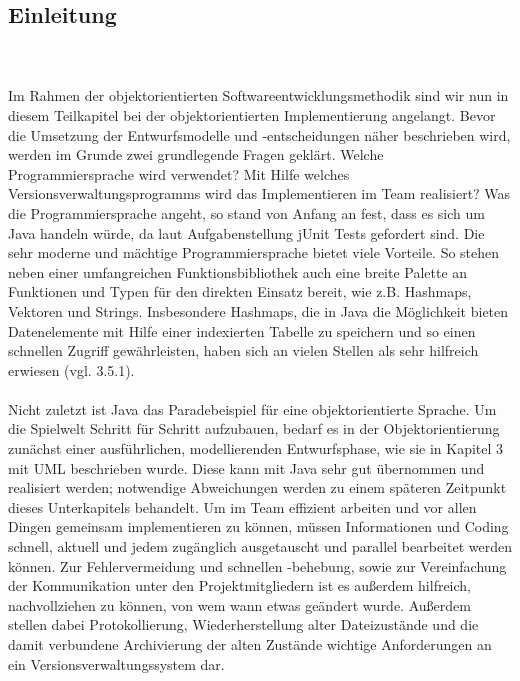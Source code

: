 \subsection{Einleitung}
\label{sub:fachkonzept-implementierung-einleitung}

\\
\\
Im Rahmen der objektorientierten Softwareentwicklungsmethodik sind wir nun in diesem Teilkapitel bei der objektorientierten Implementierung angelangt. Bevor die Umsetzung der Entwurfsmodelle und -entscheidungen näher beschrieben wird, werden im Grunde zwei grundlegende Fragen geklärt. Welche Programmiersprache wird verwendet? Mit Hilfe welches Versionsverwaltungsprogramms wird das Implementieren im Team realisiert?
Was die Programmiersprache angeht, so stand von Anfang an fest, dass es sich um Java handeln würde, da laut Aufgabenstellung jUnit Tests gefordert sind. Die sehr moderne und mächtige Programmiersprache bietet viele Vorteile. So stehen neben einer umfangreichen Funktionsbibliothek auch eine breite Palette an Funktionen und Typen für den direkten Einsatz bereit, wie z.B. Hashmaps, Vektoren und Strings. Insbesondere Hashmaps, die in Java die Möglichkeit bieten Datenelemente mit Hilfe einer indexierten Tabelle zu speichern und so einen schnellen Zugriff gewährleisten, haben sich an vielen Stellen als sehr hilfreich erwiesen (vgl. 3.5.1). 
\\
\\
Nicht zuletzt ist Java das Paradebeispiel für eine objektorientierte Sprache. Um die Spielwelt Schritt für Schritt aufzubauen, bedarf es in der Objektorientierung zunächst einer ausführlichen, modellierenden Entwurfsphase, wie sie in Kapitel 3 mit UML beschrieben wurde. Diese kann mit Java sehr gut übernommen und realisiert werden; notwendige Abweichungen werden zu einem späteren Zeitpunkt dieses Unterkapitels behandelt. 
Um im Team effizient arbeiten und vor allen Dingen gemeinsam implementieren zu können, müssen Informationen und Coding schnell, aktuell und jedem zugänglich ausgetauscht und parallel bearbeitet werden können. Zur Fehlervermeidung und schnellen -behebung, sowie zur Vereinfachung der Kommunikation unter den Projektmitgliedern ist es außerdem hilfreich, nachvollziehen zu können, von wem wann etwas geändert wurde. Außerdem stellen dabei Protokollierung, Wiederherstellung alter Dateizustände und die damit verbundene Archivierung der alten Zustände wichtige Anforderungen an ein Versionsverwaltungssystem dar. 
\\
